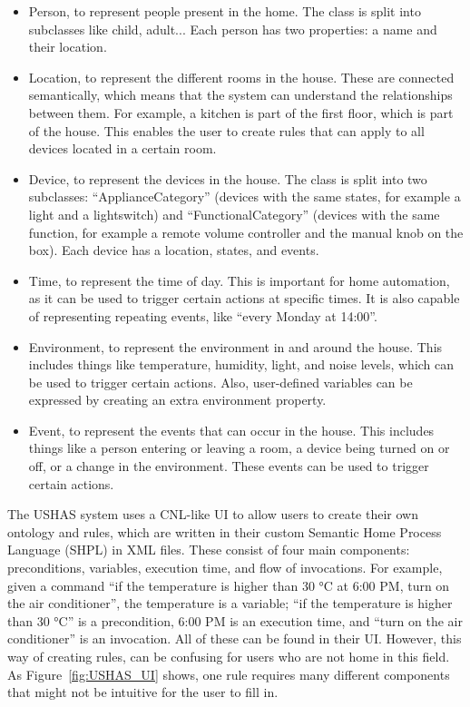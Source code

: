 \documentclass[11pt,a4paper]{report}
\begin{document}
\begin{itemize} 
    \item Person, to represent people present in the home. The class is split into subclasses like child, adult... Each person has two properties: a name and their location. 
    \item Location, to represent the different rooms in the house. These are connected semantically, which means that the system can understand the relationships between them. For example, a kitchen is part of the first floor, which is part of the house. This enables the user to create rules that can apply to all devices located in a certain room. 
    \item Device, to represent the devices in the house. The class is split into two subclasses: ``ApplianceCategory'' (devices with the same states, for example a light and a lightswitch) and ``FunctionalCategory'' (devices with the same function, for example a remote volume controller and the manual knob on the box). Each device has a location, states, and events. 
    \item Time, to represent the time of day. This is important for home automation, as it can be used to trigger certain actions at specific times. It is also capable of representing repeating events, like ``every Monday at 14:00''. 
    \item Environment, to represent the environment in and around the house. This includes things like temperature, humidity, light, and noise levels, which can be used to trigger certain actions. Also, user-defined variables can be expressed by creating an extra environment property. 
    \item Event, to represent the events that can occur in the house. This includes things like a person entering or leaving a room, a device being turned on or off, or a change in the environment. These events can be used to trigger certain actions. 
\end{itemize}

The USHAS system uses a CNL-like UI to allow users to create their own ontology and rules, which are written in their custom Semantic Home Process Language (SHPL) in XML files. These consist of four main components: preconditions, variables, execution time, and flow of invocations. For example, given a command ``if the temperature is higher than 30 °C at 6:00 PM, turn on the air conditioner'', the temperature is a variable; ``if the temperature is higher than 30 °C'' is a precondition, 6:00 PM is an execution time, and ``turn on the air conditioner'' is an invocation. All of these can be found in their UI. However, this way of creating rules, can be confusing for users who are not home in this field. As Figure~\ref{fig:USHAS_UI} shows, one rule requires many different components that might not be intuitive for the user to fill in.
\end{document}
